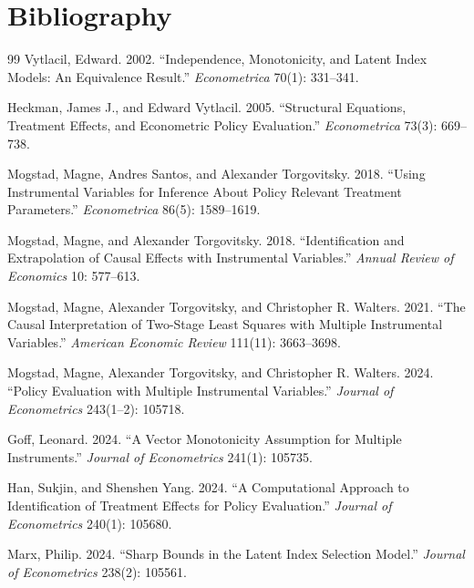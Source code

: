 \documentclass[11pt]{article}
\theoremstyle{definition}
\theoremstyle{plain}
\theoremstyle{remark}
\begin{document}
\section*{Bibliography}
\begin{thebibliography}{99}
Vytlacil, Edward. 2002.
``Independence, Monotonicity, and Latent Index Models: An Equivalence Result.''
\emph{Econometrica} 70(1): 331--341.

Heckman, James J., and Edward Vytlacil. 2005.
``Structural Equations, Treatment Effects, and Econometric Policy Evaluation.''
\emph{Econometrica} 73(3): 669--738.

Mogstad, Magne, Andres Santos, and Alexander Torgovitsky. 2018.
``Using Instrumental Variables for Inference About Policy Relevant Treatment Parameters.''
\emph{Econometrica} 86(5): 1589--1619.

Mogstad, Magne, and Alexander Torgovitsky. 2018.
``Identification and Extrapolation of Causal Effects with Instrumental Variables.''
\emph{Annual Review of Economics} 10: 577--613.

Mogstad, Magne, Alexander Torgovitsky, and Christopher R. Walters. 2021.
``The Causal Interpretation of Two-Stage Least Squares with Multiple Instrumental Variables.''
\emph{American Economic Review} 111(11): 3663--3698.

Mogstad, Magne, Alexander Torgovitsky, and Christopher R. Walters. 2024.
``Policy Evaluation with Multiple Instrumental Variables.''
\emph{Journal of Econometrics} 243(1--2): 105718.

Goff, Leonard. 2024.
``A Vector Monotonicity Assumption for Multiple Instruments.''
\emph{Journal of Econometrics} 241(1): 105735.

Han, Sukjin, and Shenshen Yang. 2024.
``A Computational Approach to Identification of Treatment Effects for Policy Evaluation.''
\emph{Journal of Econometrics} 240(1): 105680.

Marx, Philip. 2024.
``Sharp Bounds in the Latent Index Selection Model.''
\emph{Journal of Econometrics} 238(2): 105561.
\end{thebibliography}
\end{document}

